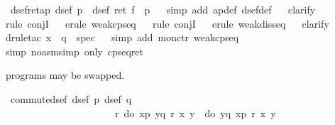 \begin{isabellebody}
\isanewline
\isanewline
\isamarkupfalse%
\ dsef{\isacharunderscore}ret{\isacharunderscore}ap{\isacharcolon}\ {\isachardoublequote}dsef\ p\ {\isasymLongrightarrow}\ dsef\ {\isacharparenleft}ret\ f\ {\isachardollar}{\isachardollar}\ p{\isacharparenright}{\isachardoublequote}\isanewline
\ \ \isamarkupfalse%
simp\ add{\isacharcolon}\ ap{\isacharunderscore}def\ dsef{\isacharunderscore}def{\isacharparenright}\isanewline
\ \ \isamarkupfalse%
clarify{\isacharparenright}\isanewline
\ \ \isamarkupfalse%
rule\ conjI{\isacharparenright}\isanewline
\ \ \isamarkupfalse%
erule\ weak{\isacharunderscore}cp{\isacharunderscore}seq{\isacharparenright}\isanewline
\ \ \isamarkupfalse%
rule\ conjI{\isacharparenright}\isanewline
\ \ \isamarkupfalse%
erule\ weak{\isacharunderscore}dis{\isacharunderscore}seq{\isacharparenright}\isanewline
\ \ \isamarkupfalse%
clarify{\isacharparenright}\isanewline
\ \ \isamarkupfalse%
drule{\isacharunderscore}tac\ x\ {\isacharequal}\ q\ \ spec{\isacharparenright}\isanewline
\ \ \isamarkupfalse%
simp\ add{\isacharcolon}\ mon{\isacharunderscore}ctr\ weak{\isacharunderscore}cp{\isacharunderscore}seq{\isacharparenright}\isanewline
\ \ \isamarkupfalse%
simp\ {\isacharparenleft}no{\isacharunderscore}asm{\isacharunderscore}simp{\isacharparenright}\ only{\isacharcolon}\ cp{\isacharunderscore}seq{\isacharunderscore}ret{\isacharparenright}\isanewline
\isamarkupfalse%
\isamarkupfalse%
%
\begin{isamarkuptext}%
 programs may be swapped. \label{isa:commute-dsef}%
\end{isamarkuptext}%
\isamarkuptrue%
\ commute{\isacharunderscore}dsef{\isacharcolon}\ {\isachardoublequote}{\isasymlbrakk}dsef\ p{\isacharsemicolon}\ dsef\ q{\isasymrbrakk}\ {\isasymLongrightarrow}\ \isanewline
\ \ \ \ \ \ \ \ \ \ \ \ \ \ \ \ \ \ \ \ \ \ {\isasymforall}r{\isachardot}\ do\ {\isacharbraceleft}x{\isasymleftarrow}p{\isacharsemicolon}\ y{\isasymleftarrow}q{\isacharsemicolon}\ r\ x\ y{\isacharbraceright}\ {\isacharequal}\ do\ {\isacharbraceleft}y{\isasymleftarrow}q{\isacharsemicolon}\ x{\isasymleftarrow}p{\isacharsemicolon}\ r\ x\ y{\isacharbraceright}{\isachardoublequote}\isanewline

\end{isabellebody}
